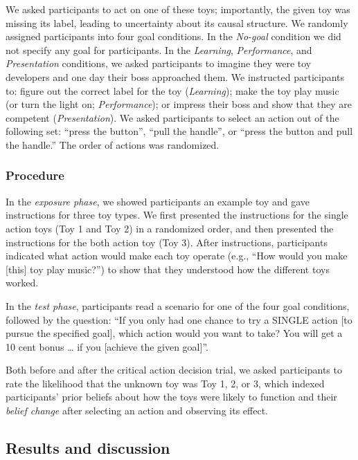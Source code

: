 \documentclass[10pt, letterpaper]{article}
\begin{document}
We asked participants to act on one of these toys; importantly, the
given toy was missing its label, leading to uncertainty about its causal
structure. We randomly assigned participants into four goal conditions.
In the \emph{No-goal} condition we did not specify any goal for
participants. In the \emph{Learning}, \emph{Performance}, and
\emph{Presentation} conditions, we asked participants to imagine they
were toy developers and one day their boss approached them. We
instructed participants to: figure out the correct label for the toy
(\emph{Learning}); make the toy play music (or turn the light on;
\emph{Performance}); or impress their boss and show that they are
competent (\emph{Presentation}). We asked participants to select an
action out of the following set: ``press the button'', ``pull the
handle'', or ``press the button and pull the handle.'' The order of
actions was randomized.

\hypertarget{procedure}{%
\subsubsection{Procedure}\label{procedure}}

In the \emph{exposure phase}, we showed participants an example toy and
gave instructions for three toy types. We first presented the
instructions for the single action toys (Toy 1 and Toy 2) in a
randomized order, and then presented the instructions for the both
action toy (Toy 3). After instructions, participants indicated what
action would make each toy operate (e.g., ``How would you make
{[}this{]} toy play music?'') to show that they understood how the
different toys worked.

In the \emph{test phase}, participants read a scenario for one of the
four goal conditions, followed by the question: ``If you only had one
chance to try a SINGLE action {[}to pursue the specified goal{]}, which
action would you want to take? You will get a 10 cent bonus \ldots{} if
you {[}achieve the given goal{]}''.

Both before and after the critical action decision trial, we asked
participants to rate the likelihood that the unknown toy was Toy 1, 2,
or 3, which indexed participants' prior beliefs about how the toys were
likely to function and their \emph{belief change} after selecting an
action and observing its effect.

\hypertarget{results-and-discussion}{%
\subsection{Results and discussion}\label{results-and-discussion}}
\end{document}
